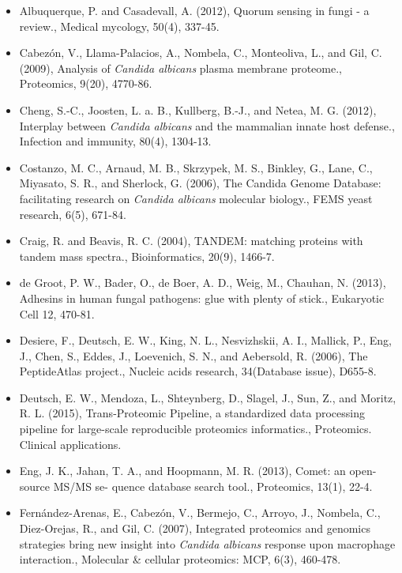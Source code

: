 \begin{itemize}

\item[]{%
Albuquerque, P. and Casadevall, A. (2012), Quorum sensing in fungi - a review.,
Medical mycology, 50(4), 337-45.
}

\item[]{%
Cabez\'on, V., Llama-Palacios, A., Nombela, C., Monteoliva, L., and Gil, C. (2009), Analysis of
\textit{Candida albicans} plasma membrane proteome., Proteomics, 9(20), 4770-86.
}


\item[]{%
Cheng, S.-C., Joosten, L. a. B., Kullberg, B.-J., and Netea, M. G. (2012), Interplay between
\textit{Candida albicans} and the mammalian innate host defense., Infection and immunity, 80(4),
1304-13.
}

\item[]{%
Costanzo, M. C., Arnaud, M. B., Skrzypek, M. S., Binkley, G., Lane, C., Miyasato, S. R., and
Sherlock, G. (2006), The Candida Genome Database: facilitating research on 
\textit{Candida albicans} molecular biology., FEMS yeast research, 6(5), 671-84.
}

\item[]{%
Craig, R. and Beavis, R. C. (2004), TANDEM: matching proteins with tandem mass spectra.,
Bioinformatics, 20(9), 1466-7.
}

\item[]{
de Groot, P. W., Bader, O., de Boer, A. D., Weig, M., Chauhan, N. (2013),
Adhesins in human fungal pathogens: glue with plenty of stick., 
Eukaryotic Cell 12, 470-81.
}

\item[]{%
Desiere, F., Deutsch, E. W., King, N. L., Nesvizhskii, A. I., Mallick, P., Eng, J., Chen, S., Eddes,
J., Loevenich, S. N., and Aebersold, R. (2006), The PeptideAtlas project., Nucleic acids
research, 34(Database issue), D655-8.
}

\item[]{%
Deutsch, E. W., Mendoza, L., Shteynberg, D., Slagel, J., Sun, Z., and Moritz, R. L. (2015),
Trans-Proteomic Pipeline, a standardized data processing pipeline for large-scale 
reproducible proteomics informatics., Proteomics. Clinical applications.
}

\item[]{%
Eng, J. K., Jahan, T. A., and Hoopmann, M. R. (2013), Comet: an open-source MS/MS se-
quence database search tool., Proteomics, 13(1), 22-4.
}

\item[]{%
Fern\'andez-Arenas, E., Cabez\'on, V., Bermejo, C., Arroyo, J., Nombela, C., Diez-Orejas, R.,
and Gil, C. (2007), Integrated proteomics and genomics strategies bring new insight into
\textit{Candida albicans} response upon macrophage interaction., 
Molecular \& cellular proteomics: MCP, 6(3), 460-478.
}


\end{itemize}
